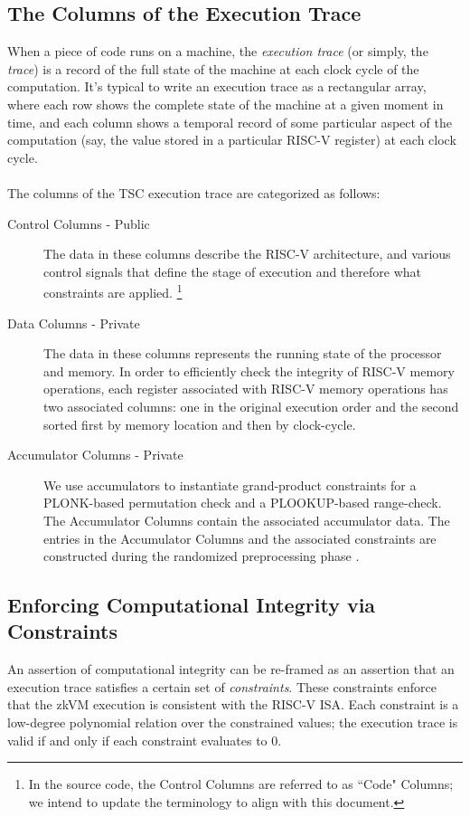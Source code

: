 \documentclass[10pt,letterpaper,titlepage]{article}
\theoremstyle{definition}
\begin{document}
\subsection{The Columns of the Execution Trace}
\label{trace}
When a piece of code runs on a machine, the \textit{execution trace} (or simply, the \textit{trace}) is a record of the full state of the machine at each clock cycle of the computation.
It's typical to write an execution trace as a rectangular array, where each row shows the complete state of the machine at a given moment in time, and each column shows a temporal record of some particular aspect of the computation (say, the value stored in a particular RISC-V register) at each clock cycle. \\
\\
The columns of the TSC execution trace are categorized as follows:
\begin{description}
  \item[Control Columns - Public] The data in these columns describe the RISC-V architecture, and various control signals that define the stage of execution and therefore what constraints are applied.%
  \footnote{In the source code, the Control Columns are referred to as ``Code" Columns; we intend to update the terminology to align with this document.} 
  \item[Data Columns - Private] The data in these columns represents the running state of the processor and memory. 
  In order to efficiently check the integrity of RISC-V memory operations, each register associated with RISC-V memory operations has two associated columns: one in the original execution order and the second sorted first by memory location and then by clock-cycle. 
  \item[Accumulator Columns - Private] We use accumulators to instantiate grand-product constraints for a PLONK-based permutation check and a PLOOKUP-based range-check. 
  The Accumulator Columns contain the associated accumulator data. 
  The entries in the Accumulator Columns and the associated constraints are constructed during the randomized preprocessing phase \cite{plonk, plookup, RAP}. \\
\end{description}

\subsection{Enforcing Computational Integrity via Constraints}
An assertion of computational integrity can be re-framed as an assertion that an execution trace satisfies a certain set of \textit{constraints}.
These constraints enforce that the zkVM execution is consistent with the RISC-V ISA.
Each constraint is a low-degree polynomial relation over the constrained values; the execution trace is valid if and only if each constraint evaluates to 0.
\end{document}
